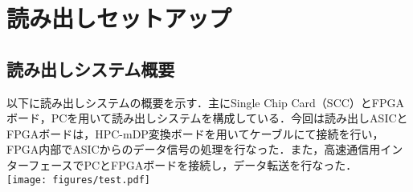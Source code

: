 \chapter{読み出しセットアップ}
\section{読み出しシステム概要}
以下に読み出しシステムの概要を示す．主にSingle Chip Card（SCC）とFPGAボード，PCを用いて読み出しシステムを構成している．今回は読み出しASICとFPGAボードは，HPC-mDP変換ボードを用いてケーブルにて接続を行い，FPGA内部でASICからのデータ信号の処理を行なった．また，高速通信用インターフェースでPCとFPGAボードを接続し，データ転送を行なった．\\

\texttt{[image: figures/test.pdf]}



